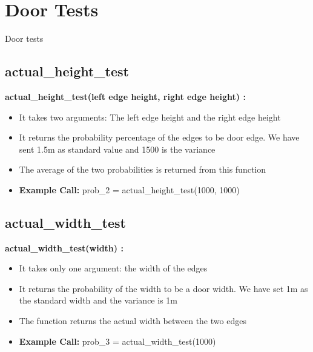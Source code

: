\documentclass[10pt, a4paper]{beamer}
\begin{document}
\section{Door Tests}
\begin{frame}[allowframebreaks]{Door tests}
  \subsection{actual\_height\_test}
    \textbf{actual\_height\_test(left edge height, right edge height) : }
      \begin{itemize}
	\item It takes two arguments: The left edge height and the right edge height
	\item It returns the probability percentage of the edges to be door edge. We have sent 1.5m as standard value and 1500 is the variance
	\item The average of the two probabilities is returned from this function
	\item \textbf{Example Call:} prob\_2 = actual\_height\_test(1000, 1000)
      \end{itemize}
\framebreak
  \subsection{actual\_width\_test}
    \textbf{actual\_width\_test(width) : }
      \begin{itemize}
       \item It takes only one argument: the width of the edges
       \item It returns the probability of the width to be a door width. We have set 1m as the standard width and the variance is 1m
       \item The function returns the actual width between the two edges
       \item \textbf{Example Call:} prob\_3 = actual\_width\_test(1000)
      \end{itemize}
\framebreak

\end{frame}
\end{document}
